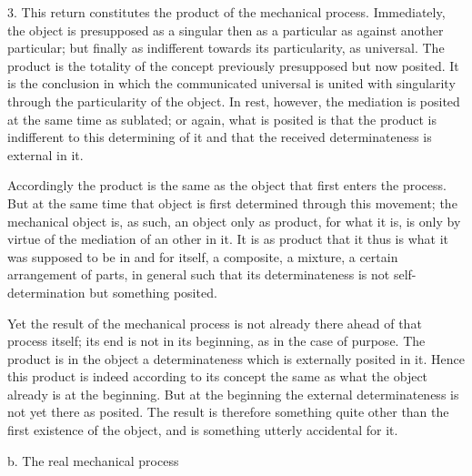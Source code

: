 3. This return constitutes the product of the mechanical process.
Immediately, the object is presupposed as a singular
then as a particular as against another particular;
but finally as indifferent towards its particularity,
as universal.
The product is the totality of the concept
previously presupposed but now posited.
It is the conclusion in which the communicated universal
is united with singularity through the particularity of the object.
In rest, however, the mediation is posited
at the same time as sublated;
or again, what is posited is
that the product is indifferent to this determining of it
and that the received determinateness is external in it.

Accordingly the product is the same as the object
that first enters the process.
But at the same time that object is
first determined through this movement;
the mechanical object is, as such,
an object only as product,
for what it is, is only by virtue of
the mediation of an other in it.
It is as product that it thus is
what it was supposed to be in and for itself,
a composite, a mixture, a certain arrangement of parts,
in general such that its determinateness is
not self-determination but something posited.

Yet the result of the mechanical process is
not already there ahead of that process itself;
its end is not in its beginning, as in the case of purpose.
The product is in the object a determinateness
which is externally posited in it.
Hence this product is indeed
according to its concept the same as
what the object already is at the beginning.
But at the beginning the external determinateness is
not yet there as posited.
The result is therefore something
quite other than the first existence of the object,
and is something utterly accidental for it.

b. The real mechanical process

